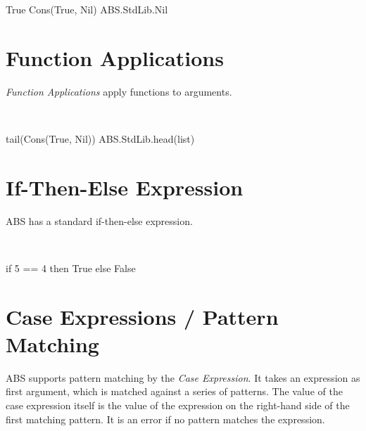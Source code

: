 \begin{absexample}
True
Cons(True, Nil)  
ABS.StdLib.Nil
\end{absexample}

\section{Function Applications}
\emph{Function Applications} apply functions to arguments.

\begin{abssyntax}
  {}\ \TRS{(}  \TRS{)}   
\end{abssyntax}

\begin{absexample}
tail(Cons(True, Nil))
ABS.StdLib.head(list)
\end{absexample}

\section{If-Then-Else Expression}
ABS has a standard if-then-else expression.

\begin{abssyntax}
   {}\ \  \  
\end{abssyntax}


\begin{absexample}
if 5 == 4 then True else False
\end{absexample}

\section{Case Expressions / Pattern Matching}
\label{sec:case-expr}
ABS supports pattern matching by the \emph{Case Expression}.  It takes
an expression as first argument, which is matched against a series of
patterns.  The value of the case expression itself is the value of the
expression on the right-hand side of the first matching pattern.
It is an error if no pattern matches the expression.


\begin{abssyntax}
        {}\ \ \TRS{\{} \ \TRS{\}}\\
     {}\ \TRS{=>}\ \ \TRS{;}\\
        {}
                  {}
                  {}
                  \TRS{\_}\\
  {}\ \\
    {}\ 
\end{abssyntax}

